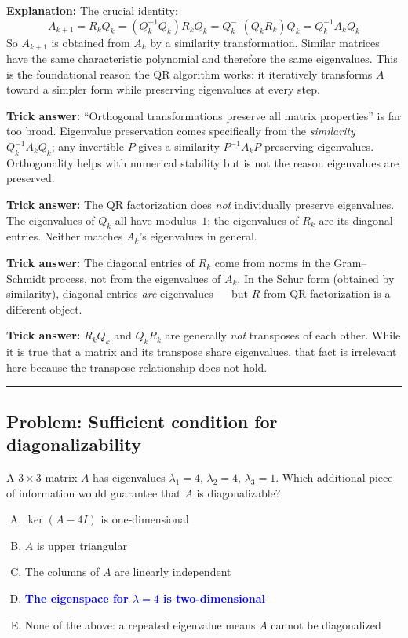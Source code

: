 \documentclass[12pt]{amsart}
\newcommand{\divider}{
  \vspace{-1em}
  \noindent
  \raisebox{-0.15ex}{\textbullet}%
  \hspace{0.5em}%
  \rule[0.5ex]{0.95\textwidth}{1.0pt}%
  \hspace{0.5em}%
  \raisebox{-0.15ex}{\textbullet}%
  \vspace{0em}
}
\begin{document}
\textbf{Explanation:}
The crucial identity:
$$A_{k+1} = R_k Q_k = (Q_k^{-1} Q_k) R_k Q_k
  = Q_k^{-1}(Q_k R_k) Q_k = Q_k^{-1} A_k Q_k$$
So $A_{k+1}$ is obtained from $A_k$ by a similarity transformation.
Similar matrices have the same characteristic polynomial and therefore
the same eigenvalues. This is the foundational reason the QR algorithm
works: it iteratively transforms $A$ toward a simpler form while
preserving eigenvalues at every step.

\textbf{Trick answer:}
``Orthogonal transformations preserve all matrix properties'' is far too
broad. Eigenvalue preservation comes specifically from the \emph{similarity}
$Q_k^{-1}A_kQ_k$; any invertible $P$ gives a similarity $P^{-1}A_kP$
preserving eigenvalues. Orthogonality helps with numerical stability but
is not the reason eigenvalues are preserved.

\textbf{Trick answer:}
The QR factorization does \emph{not} individually preserve eigenvalues.
The eigenvalues of $Q_k$ all have modulus~$1$; the eigenvalues of $R_k$
are its diagonal entries. Neither matches $A_k$'s eigenvalues in general.

\textbf{Trick answer:}
The diagonal entries of $R_k$ come from norms in the Gram--Schmidt process,
not from the eigenvalues of $A_k$. In the Schur form (obtained by
similarity), diagonal entries \emph{are} eigenvalues --- but $R$ from
QR factorization is a different object.

\textbf{Trick answer:}
$R_kQ_k$ and $Q_kR_k$ are generally \emph{not} transposes of each other.
While it is true that a matrix and its transpose share eigenvalues, that
fact is irrelevant here because the transpose relationship does not hold.

\divider

\subsection*{Problem: Sufficient condition for diagonalizability}

A $3 \times 3$ matrix $A$ has eigenvalues $\lambda_1 = 4$,
$\lambda_2 = 4$, $\lambda_3 = 1$.
Which additional piece of information would guarantee that $A$ is
diagonalizable?

\begin{enumerate}[(A)]
\item $\ker(A - 4I)$ is one-dimensional
\item $A$ is upper triangular
\item The columns of $A$ are linearly independent
\item \textcolor{blue}{\textbf{The eigenspace for $\lambda = 4$ is
      two-dimensional}}
\item None of the above: a repeated eigenvalue means $A$ cannot
      be diagonalized
\end{enumerate}
\end{document}
